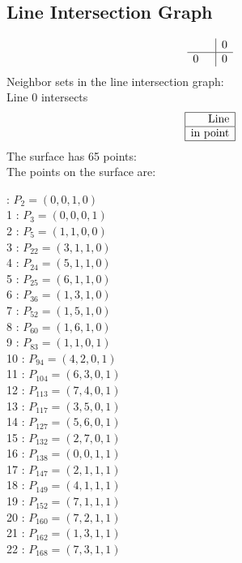\documentclass{article}
\begin{document}
{\subsection*{Line Intersection Graph}
{\arraycolsep=1pt
$$
\begin{array}{rr|*{1}r}
 &  & 0\\
\hline
0 &  & 0\\
\end{array}
$$
}%
Neighbor sets in the line intersection graph:\\
Line 0 intersects 
$$
\begin{array}{|r*{0}{|c}|}
\hline
\mbox{Line} \\
\hline
\mbox{in point} \\
\hline
\end{array}
$$
The surface has 65 points:\\
The points on the surface are:\\
\begin{multicols}{3}
 : $P_{2}=( 0, 0, 1, 0 )$\\
1 : $P_{3}=( 0, 0, 0, 1 )$\\
2 : $P_{5}=( 1, 1, 0, 0 )$\\
3 : $P_{22}=( 3, 1, 1, 0 )$\\
4 : $P_{24}=( 5, 1, 1, 0 )$\\
5 : $P_{25}=( 6, 1, 1, 0 )$\\
6 : $P_{36}=( 1, 3, 1, 0 )$\\
7 : $P_{52}=( 1, 5, 1, 0 )$\\
8 : $P_{60}=( 1, 6, 1, 0 )$\\
9 : $P_{83}=( 1, 1, 0, 1 )$\\
10 : $P_{94}=( 4, 2, 0, 1 )$\\
11 : $P_{104}=( 6, 3, 0, 1 )$\\
12 : $P_{113}=( 7, 4, 0, 1 )$\\
13 : $P_{117}=( 3, 5, 0, 1 )$\\
14 : $P_{127}=( 5, 6, 0, 1 )$\\
15 : $P_{132}=( 2, 7, 0, 1 )$\\
16 : $P_{138}=( 0, 0, 1, 1 )$\\
17 : $P_{147}=( 2, 1, 1, 1 )$\\
18 : $P_{149}=( 4, 1, 1, 1 )$\\
19 : $P_{152}=( 7, 1, 1, 1 )$\\
20 : $P_{160}=( 7, 2, 1, 1 )$\\
21 : $P_{162}=( 1, 3, 1, 1 )$\\
22 : $P_{168}=( 7, 3, 1, 1 )$\\

\end{multicols}}
\end{document}

